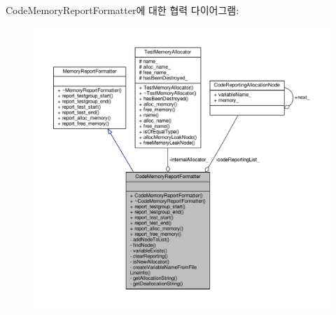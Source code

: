 Code\+Memory\+Report\+Formatter에 대한 협력 다이어그램\+:
\nopagebreak
\begin{figure}[H]
\begin{center}
\leavevmode
\includegraphics[width=350pt]{class_code_memory_report_formatter__coll__graph}
\end{center}
\end{figure}
